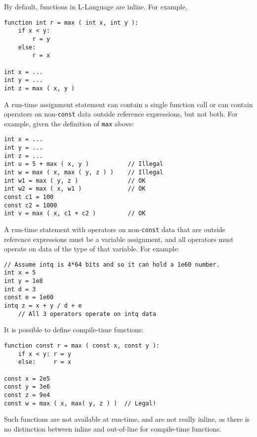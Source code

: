 \documentclass[12pt]{article}
\newenvironment{indpar}[1][0.3in]%
	{\begin{list}{}%
		     {\setlength{\itemsep}{0in}%
		      \setlength{\topsep}{0in}%
		      \setlength{\parsep}{1ex}%
		      \setlength{\labelwidth}{#1}%
		      \setlength{\leftmargin}{#1}%
		      \addtolength{\leftmargin}{\labelsep}}%
	 \item}%
	{\end{list}}
\begin{document}
By default, functions in L-Language are inline.  For example,

\begin{indpar}\begin{verbatim}
function int r = max ( int x, int y ):
    if x < y:
        r = y
    else:
        r = x

int x = ...
int y = ...
int z = max ( x, y )
\end{verbatim}\end{indpar}

A run-time assignment statement can contain a single function call
or can contain operators on non-{\tt const} data
outside reference expressions, but not both.
For example, given the definition of {\tt max} above:

\begin{indpar}\begin{verbatim}
int x = ...
int y = ...
int z = ...
int u = 5 + max ( x, y )           // Illegal
int w = max ( x, max ( y, z ) )    // Illegal
int w1 = max ( y, z )              // OK
int w2 = max ( x, w1 )             // OK
const c1 = 100
const c2 = 1000
int v = max ( x, c1 + c2 )         // OK
\end{verbatim}\end{indpar}

A run-time statement with operators on non-{\tt const} data
that are outside reference expressions must be a variable
assignment, and all operators must operate on data of the
type of that variable.  For example:

\begin{indpar}\begin{verbatim}
// Assume intq is 4*64 bits and so it can hold a 1e60 number.
int x = 5
int y = 1e8
int d = 3
const e = 1e60
intq z = x + y / d + e
    // All 3 operators operate on intq data
\end{verbatim}\end{indpar}

It is possible to define compile-time functions:

\begin{indpar}\begin{verbatim}
function const r = max ( const x, const y ):
    if x < y: r = y
    else:     r = x

const x = 2e5
const y = 3e6
const z = 9e4
const w = max ( x, max( y, z ) )  // Legal!
\end{verbatim}\end{indpar}

Such functions are not available at run-time, and
are not really inline, as there is no
distinction between inline and out-of-line for compile-time functions.
\end{document}
